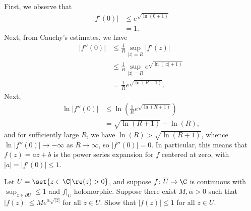 \documentclass[10pt]{mypackage}
\begin{document}
\begin{solution}
  First, we observe that
  \begin{align*}
    \left\vert f'(0) \right\vert &\leq e^{\sqrt{\ln\left( 0 + 1 \right)}}\\
                                 &= 1.
  \end{align*}
  Next, from Cauchy's estimates, we have
  \begin{align*}
    \left\vert f''(0) \right\vert &\leq \frac{1}{R} \sup_{|z| = R} \left\vert f'(z) \right\vert\\
                                  &\leq \frac{1}{R} \sup_{|z| = R} e^{\sqrt{\ln\left( \left\vert z \right\vert + 1 \right)}}\\
                                  &= \frac{1}{R} e^{\sqrt{\ln\left( R + 1 \right)}}.
  \end{align*}
  Next,
  \begin{align*}
    \ln\left\vert f''(0) \right\vert &\leq \ln\left( \frac{1}{R} e^{\sqrt{\ln\left( R + 1 \right)}} \right)\\
                                     &= \sqrt{\ln\left( R + 1 \right)} - \ln\left( R \right),
  \end{align*}
  and for sufficiently large $R$, we have $\ln\left( R \right) > \sqrt{\ln\left( R + 1 \right)}$, whence $\ln\left\vert f''(0) \right\vert \rightarrow -\infty$ as $R\rightarrow\infty$, so $\left\vert f''(0) \right\vert = 0$. In particular, this means that $f(z) = az + b$ is the power series expansion for $f$ centered at zero, with $\left\vert a \right\vert = \left\vert f'(0) \right\vert \leq 1$.
\end{solution}
\begin{problem}[Problem 3]
  Let $U = \set{z\in \C | \re(z) > 0}$, and suppose $f\colon \overline{U}\rightarrow \C$ is continuous with $\sup_{z\in \partial U} \leq 1$ and $f|_{U}$ holomorphic. Suppose there exist $M,\alpha > 0$ such that $\left\vert f(z) \right\vert \leq Me^{\alpha \sqrt{\left\vert z \right\vert}}$ for all $z\in U$. Show that $\left\vert f(z) \right\vert \leq 1$ for all $z\in U$.
\end{problem}
\end{document}
